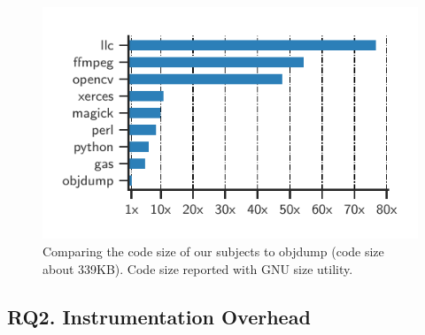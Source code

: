 \begin{figure}[t!]
	\centering
	\includegraphics[clip, trim=0.47cm 0.4cm 0.45cm 0.65cm, width=0.8\columnwidth]{fig/objdump-size-comp}
	\caption{Comparing the code size of our subjects to \textsf{objdump} (code size about 339KB). Code size reported with GNU \textsf{size} utility.}
	\label{fig:code-size-comp}
\end{figure}


\subsection*{RQ2. Instrumentation Overhead}



